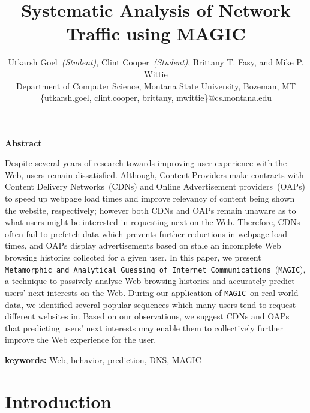 \documentclass[letterpaper,twocolumn]{article}
\date{}
\newcommand{\soll}{\texttt{Metamorphic and Analytical Guessing of Internet Communications}}
\newcommand{\sol}{\texttt{MAGIC}}
\begin{document}
\title{\textbf{Systematic Analysis of Network Traffic using MAGIC}}


\author{{\large Utkarsh Goel~\textit{(Student)}, Clint Cooper~\textit{(Student)}, Brittany T. Fasy, and Mike P. Wittie}\\
Department of Computer Science, Montana State University, Bozeman, MT\\
\{utkarsh.goel, clint.cooper, brittany, mwittie\}@cs.montana.edu\\
}
\maketitle 






\thispagestyle{empty}

\begin{center}
\large\textbf{Abstract}
\end{center}
\vspace{-5pt}

Despite several years of research towards improving user experience with the Web, users remain dissatisfied.
Although, Content Providers make contracts with Content Delivery Networks~(CDNs) and Online Advertisement providers~(OAPs) to speed up webpage load times and improve relevancy of content being shown the website, respectively; however both CDNs and OAPs remain unaware as to what users might be interested in requesting next on the Web.
Therefore, CDNs often fail to prefetch data which prevents further reductions in webpage load times, and OAPs display advertisements based on stale an incomplete Web browsing histories collected for a given user.
In this paper, we present \soll\ (\sol), a technique to passively analyse Web browsing histories and accurately predict users' next interests on the Web.
During our application of \sol\ on real world data, we identified several popular sequences which many users tend to request different websites in.
Based on our observations, we suggest CDNs and OAPs that predicting users' next interests may enable them to collectively further improve the Web experience for the user.

\medskip
\noindent
\textbf{keywords:} 
Web, behavior, prediction, DNS, MAGIC

\vspace{-8pt}
\section{Introduction}
\vspace{-8pt}
\end{document}
